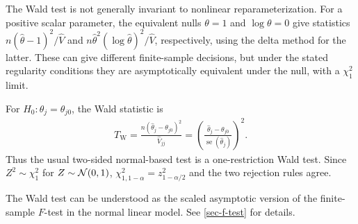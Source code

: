 \documentclass[a4paper,12pt]{article}
\begin{document}
\begin{remark}
	The Wald test is not generally invariant to nonlinear reparameterization.
	For a positive scalar parameter, the equivalent nulls $\theta=1$ and $\log\theta=0$ give statistics
	$n(\widehat\theta-1)^2/\widehat V$ and $n\widehat\theta^2(\log\widehat\theta)^2/\widehat V$, respectively, using the delta method for the latter.
	These can give different finite-sample decisions, but under the stated regularity conditions they are asymptotically equivalent under the null, with a $\chi_1^2$ limit.
\end{remark}

\begin{example}
	For $H_0:\theta_j=\theta_{j0}$, the Wald statistic is
	\begin{align}
		T_{\mathrm W}
		=\frac{n(\widehat\theta_j-\theta_{j0})^2}{\widehat V_{jj}}
		=\left(\frac{\widehat\theta_j-\theta_{j0}}{\operatorname{se}(\widehat\theta_j)}\right)^2.
	\end{align}
	Thus the usual two-sided normal-based test is a one-restriction Wald test.
	Since $Z^2\sim\chi_1^2$ for $Z\sim\operatorname{\mathcal{N}}(0,1)$,
	$\chi^2_{1,1-\alpha}=z_{1-\alpha/2}^2$ and the two rejection rules agree.
\end{example}

\begin{remark}
	The Wald test can be understood as the scaled asymptotic version of the finite-sample $F$-test in the normal linear model.
	See \autoref{sec-f-test} for details.
\end{remark}
\end{document}
